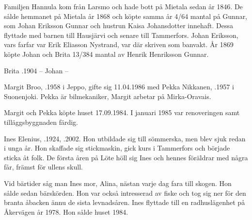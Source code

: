 \begin{jhchildren}
  \item {}
  \item {}
  \item {}
  \item {}
  \item {}
\end{jhchildren}

Familjen Hannula kom från Larsmo och hade bott på Mietala sedan år 1846. De sålde hemmanet på Mietala år 1868 och köpte samma år 4/64 mantal på Gunnar, som Johan Eriksson Gunnar och hustrun Kaisa Johansdotter innehaft. Dessa flyttade med barnen till Hausjärvi och senare till Tammerfors. Johan Eriksson, vars farfar var Erik Eliasson Nystrand, var där skriven som banvakt. År 1869 köpte Johan och Brita 13/384 mantal av Henrik Henriksson Gunnar.

Brita .1904  --  Johan --






Margit Broo, .1958 i Jeppo, gifte sig 11.04.1986 med Pekka Nikkanen, .1957 i Suonenjoki. Pekka är bilmekaniker, Margit arbetar på Mirka-Oravais.

\begin{jhchildren}
  \item {}
  \item {}
\end{jhchildren}

Margit och Pekka köpte huset 17.09.1984. I januari 1985 var renoveringen samt tilläggsbyggnaden färdig.


Ines Elenius, .1924, .2002. Hon utbildade sig till sömmerska, men blev sjuk redan i unga år. Hon skaffade sig stickmaskin, gick kurs i Tammerfors och började sticka åt folk. De första åren på Löte höll sig Ines och hennes föräldrar med några får, främst för ullens skull.

Vid bärtider såg man Ines mor, Alina, nästan varje dag fara till skogen. Hon sålde sedan bärskörden. Hon var också intresserad av fiske och tog sig ner för den branta åbacken ännu de sista levnadsåren. Ines flyttade till en radhuslägenhet på Åkervägen år 1978. Hon sålde huset 1984.

